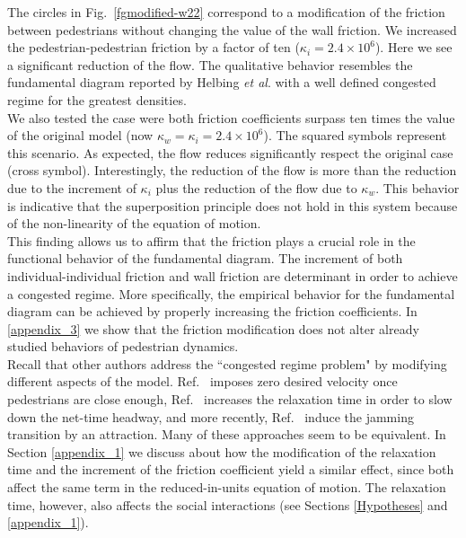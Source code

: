 \documentclass[preprint,12pt]{elsarticle}
\begin{document}
The circles in Fig.~\ref{fgmodified-w22} correspond to a modification of the friction between pedestrians without changing the value of the wall friction. We increased the pedestrian-pedestrian friction by a factor of ten ($\kappa_i = 2.4\times10^{6}$). Here we see a significant reduction of the flow. The qualitative behavior resembles the fundamental diagram reported by Helbing \textit{et al}. with a well defined congested regime for the greatest densities.\\

We also tested the case were both friction coefficients surpass ten times the value of the original model (now $\kappa_w = \kappa_i = 2.4\times10^{6}$). The squared symbols represent this scenario. As expected, the flow reduces significantly respect the original case (cross symbol). Interestingly, the reduction of the flow is more than the reduction due to the increment of $\kappa_i$ plus the reduction of the flow due to $\kappa_w$. This behavior is indicative that the superposition principle does not hold in this system because of the non-linearity of the equation of motion.     \\

This finding allows us to affirm that the friction plays a crucial role in the functional behavior of the fundamental diagram. The increment of both individual-individual friction and wall friction are determinant in order to achieve a congested regime. More specifically, the empirical behavior for the fundamental diagram can be achieved by properly increasing the friction coefficients. In \ref{appendix_3} we show that the friction modification does not alter already studied behaviors of pedestrian dynamics.\\

Recall that other authors address the ``congested regime problem" by modifying different aspects of the model. Ref.~\cite{parisi2} imposes zero desired velocity once pedestrians are close enough, Ref.~\cite{johansson} increases the relaxation time in order to slow down the net-time headway, and more recently,  Ref.~\cite{kwak} induce the jamming transition by an attraction. Many of these approaches seem to be equivalent. In Section \ref{appendix_1} we discuss about how the modification of the relaxation time and the increment of the friction coefficient yield a similar effect, since both affect the same term in the reduced-in-units equation of motion.  The relaxation time, however, also affects the social interactions (see Sections \ref{Hypotheses} and \ref{appendix_1}).   \\
\end{document}
